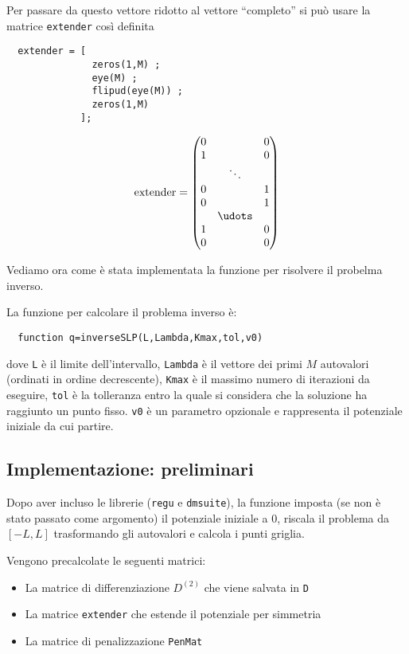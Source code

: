 \documentclass[a4paper,10pt]{article}
\theoremstyle{plain}
\theoremstyle{definition}
\theoremstyle{remark}
\begin{document}
Per passare da questo vettore ridotto al vettore ``completo'' si può
usare la matrice \lstinline{extender} così definita
\begin{lstlisting}
  extender = [ 
               zeros(1,M) ; 
               eye(M) ;
               flipud(eye(M)) ;
               zeros(1,M)
             ];
\end{lstlisting}
\begin{equation*}
  \lstinline{extender} =
  \begin{pmatrix}
    0 & & 0 \\
    1 & & 0 \\
    & \ddots & \\
    0 & & 1 \\
    0 & & 1 \\
    & \udots & \\
    1 & &0 \\
    0 & & 0\\
  \end{pmatrix}
\end{equation*}

Vediamo ora come è stata implementata la funzione per risolvere il
probelma inverso.

La funzione per calcolare il problema inverso è:
\begin{lstlisting}
  function q=inverseSLP(L,Lambda,Kmax,tol,v0)
\end{lstlisting}
dove \lstinline{L} è il limite dell'intervallo, \lstinline{Lambda} è
il vettore dei primi $M$ autovalori (ordinati in ordine decrescente),
\lstinline{Kmax} è il massimo numero di iterazioni da eseguire,
\lstinline{tol} è la tolleranza entro la quale si considera che la
soluzione ha raggiunto un punto fisso. \lstinline{v0} è un parametro
opzionale e rappresenta il potenziale iniziale da cui partire.

\subsection{Implementazione: preliminari}

Dopo aver incluso le librerie (\lstinline{regu} e
\lstinline{dmsuite}), la funzione imposta (se non è stato passato come
argomento) il potenziale iniziale a $0$, riscala il problema da
$[-L,L]$ trasformando gli autovalori e calcola i punti griglia.

Vengono precalcolate le seguenti matrici:
\begin{itemize}
\item La matrice di differenziazione $D^{(2)}$ che viene salvata in
  \lstinline{D}
\item La matrice \lstinline{extender} che estende il potenziale per
  simmetria
\item La matrice di penalizzazione \lstinline{PenMat}
\end{itemize}
\end{document}

